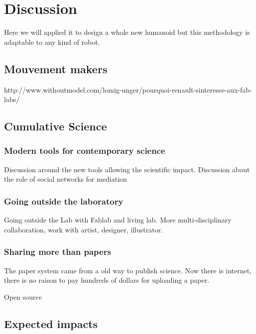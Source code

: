 

\chapter{Discussion} %

Here we will applied it to design a whole new humanoid but this methodology is adaptable to any kind of robot.

\section{Mouvement makers} %

http://www.withoutmodel.com/lomig-unger/pourquoi-renault-sinteresse-aux-fab-labs/

\section{Cumulative Science} %

\subsection{Modern tools for contemporary science} %

Discussion around the new tools allowing the scientific impact.
Discussion about the role of social networks for mediation

\subsection{Going outside the laboratory} %
Going outside the Lab with Fablab and living lab.
More multi-disciplinary collaboration, work with artist, designer, illustrator.


\subsection{Sharing more than papers} %

The paper system came from a old way to publish science. Now there is internet, there is no raison to pay hundreds of dollars for uploading a paper.

Open source


\section{Expected impacts} %

